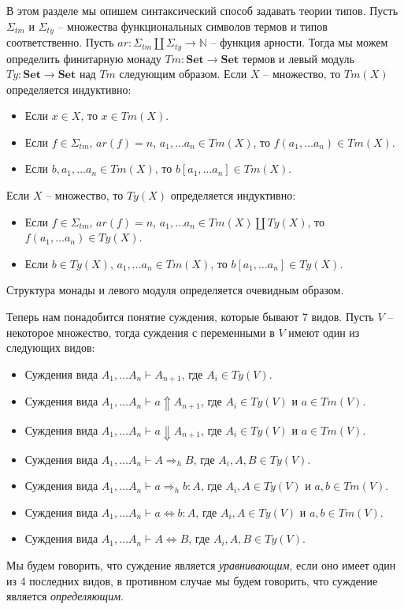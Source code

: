 \documentclass{amsart}
\theoremstyle{definition}
\theoremstyle{remark}
\newcommand{\red}{\Rightarrow}
\newcommand{\deq}{\Leftrightarrow}
\newcommand{\cat}[1]{\mathbf{#1}}
\newcommand{\Set}{\cat{Set}}
\numberwithin{figure}{section}
\begin{document}
В этом разделе мы опишем синтаксический способ задавать теории типов.
Пусть $\Sigma_{tm}$ и $\Sigma_{ty}$ -- множества функциональных символов термов и типов соответственно.
Пусть $ar : \Sigma_{tm} \amalg \Sigma_{ty} \to \mathbb{N}$ -- функция арности.
Тогда мы можем определить финитарную монаду $Tm : \Set \to \Set$ термов и левый модуль $Ty : \Set \to \Set$ над $Tm$ следующим образом.
Если $X$ -- множество, то $Tm(X)$ определяется индуктивно:
\begin{itemize}
\item Если $x \in X$, то $x \in Tm(X)$.
\item Если $f \in \Sigma_{tm}$, $ar(f) = n$, $a_1, \ldots a_n \in Tm(X)$, то $f(a_1, \ldots a_n) \in Tm(X)$.
\item Если $b, a_1, \ldots a_n \in Tm(X)$, то $b[a_1, \ldots a_n] \in Tm(X)$.
\end{itemize}
Если $X$ -- множество, то $Ty(X)$ определяется индуктивно:
\begin{itemize}
\item Если $f \in \Sigma_{tm}$, $ar(f) = n$, $a_1, \ldots a_n \in Tm(X) \amalg Ty(X)$, то $f(a_1, \ldots a_n) \in Ty(X)$.
\item Если $b \in Ty(X)$, $a_1, \ldots a_n \in Tm(X)$, то $b[a_1, \ldots a_n] \in Ty(X)$.
\end{itemize}
Структура монады и левого модуля определяется очевидным образом.

Теперь нам понадобится понятие суждения, которые бывают 7 видов.
Пусть $V$ -- некоторое множество, тогда суждения с переменными в $V$ имеют один из следующих видов:
\begin{itemize}
\item Суждения вида $A_1, \ldots A_n \vdash A_{n+1}$, где $A_i \in Ty(V)$.
\item Суждения вида $A_1, \ldots A_n \vdash a \Uparrow A_{n+1}$, где $A_i \in Ty(V)$ и $a \in Tm(V)$.
\item Суждения вида $A_1, \ldots A_n \vdash a \Downarrow A_{n+1}$, где $A_i \in Ty(V)$ и $a \in Tm(V)$.
\item Суждения вида $A_1, \ldots A_n \vdash A \red_h B$, где $A_i, A, B \in Ty(V)$.
\item Суждения вида $A_1, \ldots A_n \vdash a \red_h b : A$, где $A_i, A \in Ty(V)$ и $a, b \in Tm(V)$.
\item Суждения вида $A_1, \ldots A_n \vdash a \deq b : A$, где $A_i, A \in Ty(V)$ и $a, b \in Tm(V)$.
\item Суждения вида $A_1, \ldots A_n \vdash A \deq B$, где $A_i, A, B \in Ty(V)$.
\end{itemize}
Мы будем говорить, что суждение является \emph{уравнивающим}, если оно имеет один из 4 последних видов, в противном случае мы будем говорить, что суждение является \emph{определяющим}.
\end{document}
